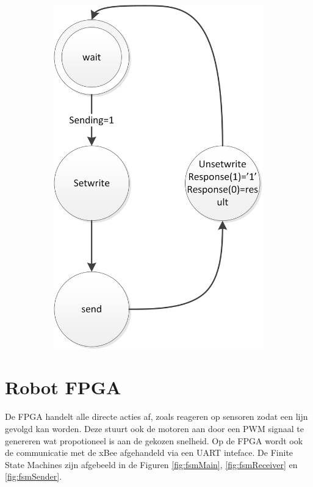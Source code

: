 \documentclass{report}
\begin{document}
\begin{figure}
\begin{subfigure}{0.23\linewidth}
\includegraphics[width=\linewidth]{FSMSender}
\end{subfigure}
\end{figure}
\section{Robot FPGA}
De FPGA handelt alle directe acties af, zoals reageren op sensoren zodat een lijn gevolgd kan worden. Deze stuurt ook de motoren aan door een PWM signaal te genereren wat propotioneel is aan de gekozen snelheid. Op de FPGA wordt ook de communicatie met de xBee afgehandeld via een UART inteface. De Finite State Machines zijn afgebeeld in de Figuren \ref{fig:fsmMain}, \ref{fig:fsmReceiver} en \ref{fig:fsmSender}.
\end{document}
